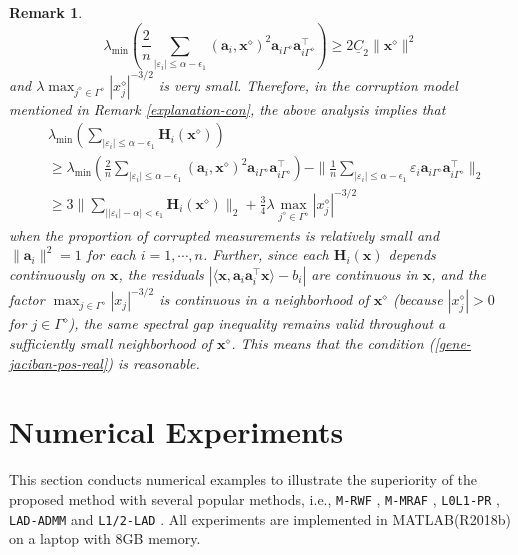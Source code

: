 \documentclass{article}
\newtheorem{remark}{Remark}
\numberwithin{equation}{section}
\begin{document}
\begin{remark}
	$$\lambda_{\mathrm{min}}(\frac{2}{n}\sum_{|\varepsilon_i|\leq\alpha-\epsilon_1}(\mathbf{a}_i,\mathbf{x}^\diamond)^2
	\mathbf{a}_{i\Gamma^\diamond}\mathbf{a}_{i\Gamma^\diamond}^\top)\geq 2\underline{C}_2\|\mathbf{x}^\diamond\|^2$$
	and $\lambda\max_{j^\diamond\in\Gamma^\diamond}|x_j^\diamond|^{-3/2}$ is very small. 
	Therefore, in the corruption model mentioned in Remark \ref{explanation-con}, the above analysis implies that 
	$$\begin{aligned}&\lambda_{\mathrm{min}}(\sum_{|\varepsilon_i|\leq\alpha-\epsilon_1}\mathbf{H}_i(\mathbf{x}^\diamond))\\
		&\geq\lambda_{\mathrm{min}}(\frac{2}{n}\sum_{|\varepsilon_i|\leq\alpha-\epsilon_1}(\mathbf{a}_i,\mathbf{x}^\diamond)^2
		\mathbf{a}_{i\Gamma^\diamond}\mathbf{a}_{i\Gamma^\diamond}^\top)-\|\frac{1}{n}\sum_{|\varepsilon_i|\leq\alpha-\epsilon_1}\varepsilon_i
		\mathbf{a}_{i\Gamma^\diamond}\mathbf{a}_{i\Gamma^\diamond}^\top\|_2\\		
		& \geq 3\|\sum_{\big||\varepsilon_i|-\alpha\big|<\epsilon_1}\mathbf{H}_i(\mathbf{x}^\diamond)\|_2+\frac{3}{4}\lambda\max_{j^\diamond\in\Gamma^\diamond}|x_j^\diamond|^{-3/2}\end{aligned}$$
	when the proportion of corrupted measurements is relatively small and $\|\mathbf{a}_i\|^2=1$ for each $i=1,\cdots,n$. Further, since
 each \(\mathbf{H}_i(\mathbf{x})\) depends continuously on \(\mathbf{x}\),
	 the residuals $|\langle \mathbf{x},\mathbf{a}_i \mathbf{a}_i^\top \mathbf{x}\rangle - b_i|$ are continuous in \(\mathbf{x}\), and the factor \(\max_{j\in\Gamma^\diamond}|x_j|^{-3/2}\) is continuous in a neighborhood of \(\mathbf{x}^\diamond\) (because \(|x_j^\diamond|>0\) for \(j\in\Gamma^\diamond\)),
		the same spectral gap inequality remains valid throughout a sufficiently small neighborhood of \(\mathbf{x}^\diamond\). This means that the	condition 
 (\ref{gene-jaciban-pos-real}) is  reasonable.
\end{remark}



\section{Numerical Experiments}\label{numerical}
This section conducts numerical examples to illustrate the superiority of the proposed method with several popular methods, i.e., \verb"M-RWF" \cite{ZhangHuishuai2018Median}, \verb"M-MRAF" \cite{2021Median}, \verb"L0L1-PR" \cite{2016}, \verb"LAD-ADMM" \cite{2020Robust} and \verb"L1/2-LAD" \cite{kong20221}. All experiments are implemented in MATLAB(R2018b) on a laptop with 8GB memory. 
\end{document}
